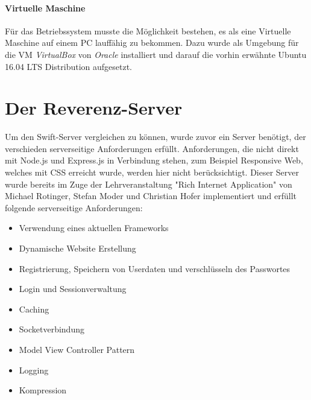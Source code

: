 \paragraph{Virtuelle Maschine}
Für das Betriebssystem musste die Möglichkeit bestehen, es als eine Virtuelle Maschine auf einem PC lauffähig zu bekommen. Dazu wurde als Umgebung für die VM \textit{VirtualBox} von \textit{Oracle} installiert und darauf die vorhin erwähnte Ubuntu 16.04 LTS Distribution aufgesetzt.

\section{Der Reverenz-Server}
\label{sec:derreverenzserver}

Um den Swift-Server vergleichen zu können, wurde zuvor ein Server benötigt, der verschieden serverseitige Anforderungen erfüllt. Anforderungen, die nicht direkt mit Node.js und Express.js in Verbindung stehen, zum Beispiel Responsive Web, welches mit CSS erreicht wurde, werden hier nicht berücksichtigt. Dieser Server wurde bereits im Zuge der Lehrveranstaltung "Rich Internet Application" von Michael Rotinger, Stefan Moder und Christian Hofer implementiert und erfüllt folgende serverseitige Anforderungen: 
\begin{itemize}
	\item Verwendung eines aktuellen Frameworks
	\item Dynamische Website Erstellung
	\item Registrierung, Speichern von Userdaten und verschlüsseln des Passwortes
	\item Login und Sessionverwaltung
	\item Caching
	\item Socketverbindung
	\item Model View Controller Pattern
	\item Logging
	\item Kompression
\end{itemize}

